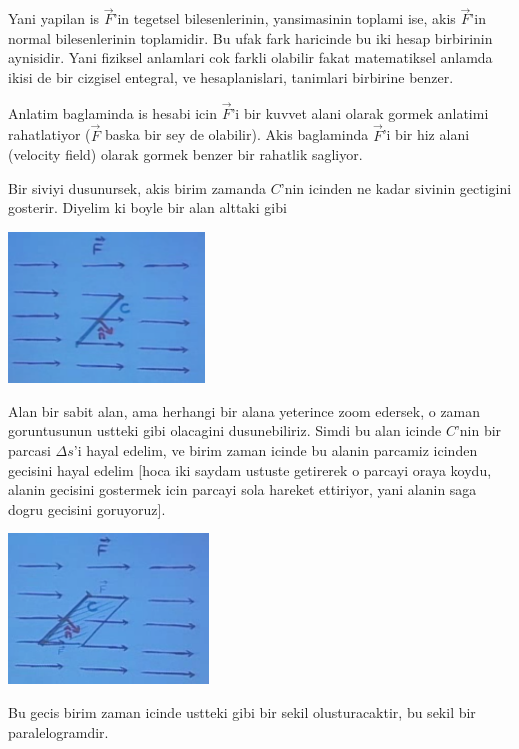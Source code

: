 \documentclass[12pt,fleqn]{article}
\begin{document}
Yani yapilan is $\vec{F}$'in tegetsel bilesenlerinin, yansimasinin toplami
ise, akis $\vec{F}$'in normal bilesenlerinin toplamidir. Bu ufak fark
haricinde bu iki hesap birbirinin aynisidir. Yani fiziksel anlamlari cok
farkli olabilir fakat matematiksel anlamda ikisi de bir cizgisel entegral,
ve hesaplanislari, tanimlari birbirine benzer. 

Anlatim baglaminda is hesabi icin $\vec{F}$'i bir kuvvet alani olarak gormek
anlatimi rahatlatiyor ($\vec{F}$ baska bir sey de olabilir). Akis
baglaminda $\vec{F}$'i bir hiz alani (velocity field) olarak gormek
benzer bir rahatlik sagliyor. 

Bir siviyi dusunursek, akis birim zamanda $C$'nin icinden ne kadar sivinin
gectigini gosterir. Diyelim ki boyle bir alan alttaki gibi

\includegraphics[height=4cm]{23_3.png}

Alan bir sabit alan, ama herhangi bir alana yeterince zoom edersek, o zaman
goruntusunun ustteki gibi olacagini dusunebiliriz. Simdi bu alan icinde
$C$'nin bir parcasi $\Delta s$'i hayal edelim, ve birim zaman icinde bu
alanin parcamiz icinden gecisini hayal edelim [hoca iki saydam ustuste
getirerek o parcayi oraya koydu, alanin gecisini gostermek icin parcayi
sola hareket ettiriyor, yani alanin saga dogru gecisini goruyoruz].

\includegraphics[height=4cm]{23_4.png}

Bu gecis birim zaman icinde ustteki gibi bir sekil olusturacaktir, bu
sekil bir paralelogramdir. 
\end{document}
